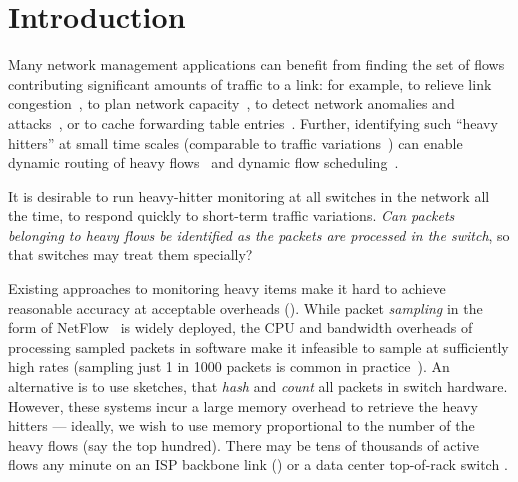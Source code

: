 \section{Introduction}
\label{sec:intro}


Many network management applications can benefit from finding the set of flows
contributing significant amounts of traffic to a link: for example, to relieve
link congestion~\cite{netscope}, to plan network
capacity~\cite{att-deriving-traffic-demands}, to detect network anomalies and
attacks~\cite{network-wide-anomalies}, or to cache forwarding table
entries~\cite{cacheflow}.
%
Further, identifying such ``heavy hitters'' at small time scales (comparable to
traffic variations~\cite{hedera, microTE}) can enable dynamic routing of heavy
flows~\cite{devoflow, planck} and dynamic flow scheduling~\cite{pifo}.

It is desirable to run heavy-hitter monitoring at all switches in the network
all the time, to respond quickly to short-term traffic variations. {\em Can
  packets belonging to heavy flows be identified as the packets are processed in
  the switch}, so that switches may treat them specially?

Existing approaches to monitoring heavy items make it hard to achieve
reasonable accuracy at acceptable overheads (). While packet
{\em sampling} in the form of NetFlow~\cite{cisco-netflow} is widely deployed,
the CPU and bandwidth overheads of processing sampled packets in software make
it infeasible to sample at sufficiently high rates (sampling just 1 in 1000
packets is common in practice~\cite{sflow-sampling-rate}). An alternative
is to use sketches, \eg \cite{cormode2005improved, li2016flowradar,
  yu2013software, univmon} that {\em hash} and {\em count} all packets in switch
hardware. However, these systems incur a large memory overhead to retrieve the heavy hitters
--- ideally, we wish to use memory proportional to the number of the heavy flows (say the top hundred). There may be tens of thousands of
active flows any minute on an ISP backbone link () or a data
center top-of-rack switch \cite{theo-dc-traffic}.

